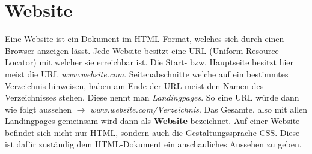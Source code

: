 \section{Website}
\label{websitetheorie}

Eine Website ist ein Dokument im HTML-Format, welches sich durch einen Browser anzeigen lässt.
Jede Website besitzt eine URL (Uniform Resource Locator) mit welcher sie erreichbar ist.
Die Start- bzw. Hauptseite besitzt hier meist die URL \textit{www.website.com}. Seitenabschnitte 
welche auf ein bestimmtes Verzeichnis hinweisen, haben am Ende der URL meist den Namen des 
Verzeichnisses stehen. Diese nennt man \textit{Landingpages}. So eine URL würde dann wie folgt aussehen $\rightarrow$ 
\textit{www.website.com/Verzeichnis}. Das Gesamte, also mit allen Landingpages 
gemeinsam wird dann als \textbf{Website} bezeichnet. Auf einer Website befindet sich nicht nur HTML, 
sondern auch die Gestaltungssprache CSS. Diese ist dafür zuständig dem HTML-Dokument ein 
anschauliches Aussehen zu geben.~\cite{Website}